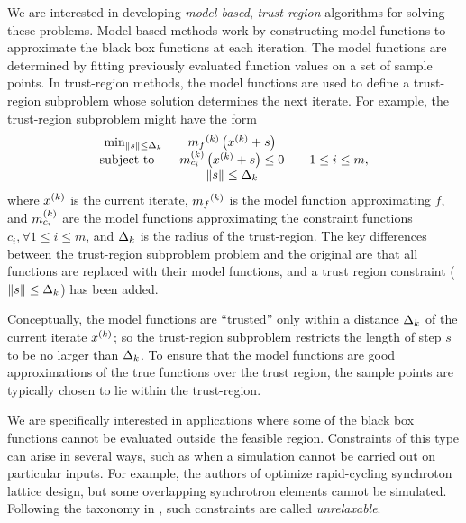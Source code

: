 \documentclass{article}
\begin{document}
We are interested in developing {\em model-based}, {\em trust-region} algorithms for solving these problems.
Model-based methods work by constructing model functions to approximate the black box functions at each iteration.
The model functions are determined by fitting previously evaluated function values on a set of sample points.
In trust-region methods, the model functions are used to define a trust-region subproblem whose solution determines the next iterate.
For example, the trust-region subproblem might have the form
\begin{align*}
\begin{array}{ccl} \min_{\|s\| \le \Delta_k}
 & {{m}_f}^{(k)} \left(x^{(k)}+s\right) \\
\mbox{subject to} \quad & {{m}^{(k)}_{c_i}}\left(x^{(k)} + s\right) \le 0 & \quad 1 \le i \le m, \\
& \|s\| \le \Delta_k \\
\end{array}
\end{align*}
where $x^{(k)}$ is the current iterate, ${{m}_f}^{(k)}$ is the model function approximating $f$, 
and ${{m}^{(k)}_{c_i}}$ are the model functions approximating the constraint functions $c_i, \forall 1 \le i \le m$, and $\Delta_k$ is the radius of the trust-region.
The key differences between the trust-region subproblem problem and the original are that all functions are replaced with their model functions, 
and a trust region constraint ($\|s\| \le \Delta_k$) has been added.




Conceptually, the model functions are ``trusted'' only within a distance $ \Delta_k $ of the current iterate $x^{(k)}$; 
so the trust-region subproblem restricts the length of step $s$ to be no larger than $\Delta_k$.
To ensure that the model functions are good approximations of the true functions over the trust region, 
the sample points are typically chosen to lie within the trust-region.

We are specifically interested in applications where some of the black box functions cannot be evaluated outside the feasible region.  Constraints of this type can arise in several ways, such as when a simulation cannot be carried out on particular inputs.
For example, the authors of \cite{Padidar2021} optimize rapid-cycling synchroton lattice design,
but some overlapping synchrotron elements cannot be simulated.
Following the taxonomy in \cite{ledigabel2015taxonomy},  such constraints are called {\em unrelaxable}.
\end{document}
